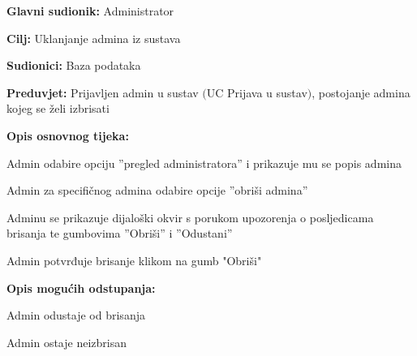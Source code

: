 \noindent {}
\begin{packed_item}

	\item \textbf{Glavni sudionik: } Administrator
	\item  \textbf{Cilj:} Uklanjanje admina iz sustava
	\item  \textbf{Sudionici:} Baza podataka
	\item  \textbf{Preduvjet:} Prijavljen admin u sustav $($UC Prijava u sustav$)$, postojanje
	admina kojeg se želi izbrisati
	\item  \textbf{Opis osnovnog tijeka:}
	
	\item[] \begin{packed_enum}

		\item Admin odabire opciju ”pregled administratora” i prikazuje mu se popis admina
		\item Admin za specifičnog admina odabire opcije ”obriši admina”
		\item Adminu se prikazuje dijaloški okvir s porukom upozorenja o posljedicama brisanja te gumbovima ”Obriši” i ”Odustani”
		\item Admin potvrđuje brisanje klikom na gumb "Obriši"
	\end{packed_enum}

	\item  \textbf{Opis mogućih odstupanja:}
	
	\item[] \begin{packed_item}

		\item[4.a] Admin odustaje od brisanja
		\item[] \begin{packed_enum}
			
			\item Admin ostaje neizbrisan
			
		\end{packed_enum}
		
	\end{packed_item}
	
\end{packed_item}

